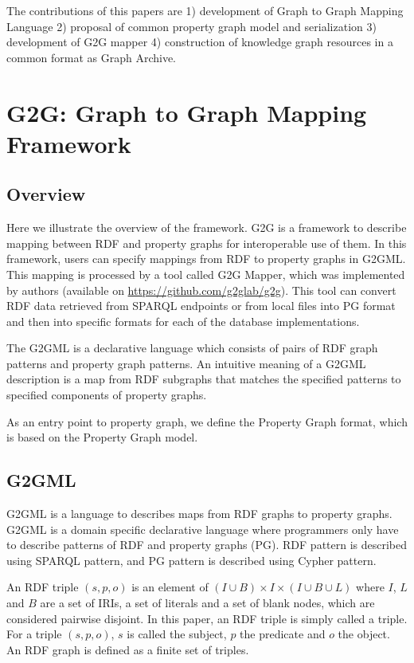 \documentclass[runningheads]{llncs}
\begin{document}
The contributions of this papers are 1) development of Graph to Graph Mapping Language 2) proposal of common property graph model and serialization 3) development of G2G mapper 4) construction of knowledge graph resources in a common format as Graph Archive.


\section{G2G: Graph to Graph Mapping Framework}

\subsection{Overview}

Here we illustrate the overview of the framework.
G2G is a framework to describe mapping between RDF and property graphs for interoperable use of them. In this framework, users can specify mappings from RDF to property graphs in G2GML.
This mapping is processed by a tool called G2G Mapper, which was implemented by authors (available on \url{https://github.com/g2glab/g2g}). This tool can convert RDF data retrieved from SPARQL endpoints or from local files into PG format and then into specific formats for each of the database implementations.

The G2GML is a declarative language which consists of pairs of RDF graph patterns and property graph patterns. 
An intuitive meaning of a G2GML description is a map from  RDF subgraphs that matches the specified patterns to specified components of property graphs.

As an entry point to property graph, we define the Property Graph format, which is based on the Property Graph model.



\subsection{G2GML}

G2GML is a language to describes maps from RDF graphs to property graphs. G2GML is a domain specific declarative language where programmers only have to describe patterns of RDF and property graphs (PG). RDF pattern is described using SPARQL pattern, and PG pattern is described using Cypher pattern.

\begin{prel}
An RDF triple $(s, p, o)$ is an element of $(I \cup B) \times I \times (I \cup B \cup L)$ where $I$, $L$ and $B$ are a set of IRIs, a set of literals and a set of blank nodes, which are considered pairwise disjoint. In this paper, an RDF triple is simply called a triple. For a triple $(s, p, o)$, $s$ is called the subject, $p$ the predicate and $o$ the object. An RDF graph is defined as a finite set of triples.
\end{prel}
\end{document}
